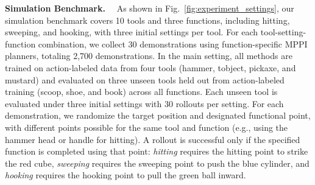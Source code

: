 

\textbf{Simulation Benchmark.}~~
As shown in Fig.~\ref{fig:experiment_settings}, our simulation benchmark covers 10 tools and three functions, including hitting, sweeping, and hooking, with three initial settings per tool.
For each tool-setting-function combination, we collect 30 demonstrations using function-specific MPPI planners, totaling 2,700 demonstrations.
In the main setting, all methods are trained on action-labeled data from four tools (hammer, tobject, pickaxe, and mustard) and evaluated on three unseen tools held out from action-labeled training (scoop, shoe, and book) across all functions.
Each unseen tool is evaluated under three initial settings with 30 rollouts per setting.
For each demonstration, we randomize the target position and designated functional point, with different points possible for the same tool and function (e.g., using the hammer head or handle for hitting).
A rollout is successful only if the specified function is completed using that point: \textit{hitting} requires the hitting point to strike the red cube, \textit{sweeping} requires the sweeping point to push the blue cylinder, and \textit{hooking} requires the hooking point to pull the green ball inward.




